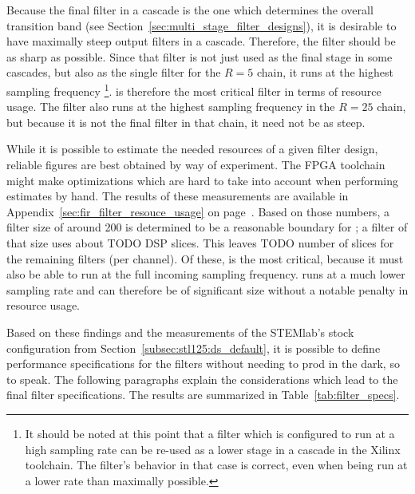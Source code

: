 Because the final filter in a cascade  is the one which determines the overall
transition  band  (see  Section~\ref{sec:multi_stage_filter_designs}),  it  is
desirable to have maximally steep  output filters in a cascade. Therefore, the
filter  should be as sharp  as possible. Since that filter is not
just used as the  final stage in some cascades, but also  as the single filter
for the $R=5$ chain, it runs  at the highest sampling frequency%
\footnote{%
    It should be noted at this point  that a filter which is configured to run
    at a high  sampling rate can be re-used  as a lower stage in  a cascade in
    the Xilinx toolchain. The filter's behavior  in that case is correct, even
    when being run at a lower rate than maximally possible.%
}.
  is therefore  the most  critical  filter in  terms of  resource
usage. The filter  also runs  at the highest sampling frequency in
the $R=25$  chain, but because it  is not the  final filter in that  chain, it
need not be as steep.

While  it is  possible to  estimate  the needed  resources of  a given  filter
design,  reliable  figures  are  best   obtained  by  way  of  experiment. The
FPGA  toolchain  might  make  optimizations   which  are  hard  to  take  into
account   when  performing   estimates  by   hand.   The   results  of   these
measurements are  available in  Appendix~\ref{sec:fir_filter_resouce_usage} on
page~\pageref{sec:fir_filter_resouce_usage}. Based on those  numbers, a filter
size  of around  \num{200}  is  determined to  be  a  reasonable boundary  for
; a filter of that size uses about
TODO
DSP slices. This leaves
TODO
number  of  slices   for  the  remaining  filters   (per  channel). Of  these,
 is the most critical, because it  must also be able to run at the
full incoming sampling frequency.   runs at a much lower sampling
rate  and can therefore be of significant size without a notable penalty in
resource usage.

Based  on  these  findings  and   the  measurements  of  the  STEMlab's  stock
configuration from  Section~\ref{subsec:stl125:ds_default}, it is  possible to
define performance specifications  for the filters without needing  to prod in
the dark,  so to  speak. The following  paragraphs explain  the considerations
which lead to  the final filter specifications. The results  are summarized in
Table~\ref{tab:filter_specs}.

